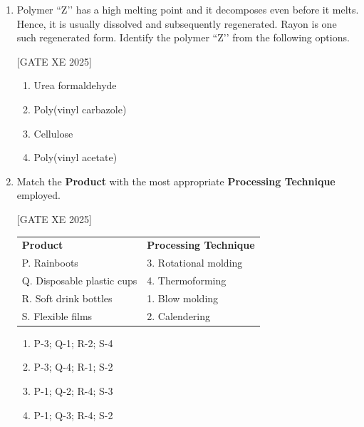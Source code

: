 \documentclass[journal,12pt,onecolumn]{IEEEtran}
\theoremstyle{remark}
\begin{document}
\begin{enumerate}
\begin{multicols}{2}
\begin{enumerate}
\item Poly(ethylene terephthalate)
\item Polystyrene
\item Acrylonitrile butadiene styrene
\item Poly(vinyl chloride)
\end{enumerate}
\end{multicols}

\item Polymer ``Z’’ has a high melting point and it decomposes even before it melts. Hence, it is usually dissolved and subsequently regenerated. Rayon is one such regenerated form. Identify the polymer ``Z’’ from the following options.

\hfill[GATE XE 2025]

\begin{multicols}{2}
\begin{enumerate}
\item Urea formaldehyde
\item Poly(vinyl carbazole)
\item Cellulose
\item Poly(vinyl acetate)
\end{enumerate}
\end{multicols}

\item Match the \textbf{Product} with the most appropriate \textbf{Processing Technique} employed.

\hfill[GATE XE 2025]

\begin{center}
\begin{tabular}{l l}
\textbf{Product} & \textbf{Processing Technique} \\
P. Rainboots & 3. Rotational molding \\
Q. Disposable plastic cups & 4. Thermoforming \\
R. Soft drink bottles & 1. Blow molding \\
S. Flexible films & 2. Calendering \\
\end{tabular}
\end{center}

\begin{multicols}{2}
\begin{enumerate}
\item P-3; Q-1; R-2; S-4
\item P-3; Q-4; R-1; S-2
\item P-1; Q-2; R-4; S-3
\item P-1; Q-3; R-4; S-2
\end{enumerate}
\end{multicols}


\end{enumerate}
\end{document}
